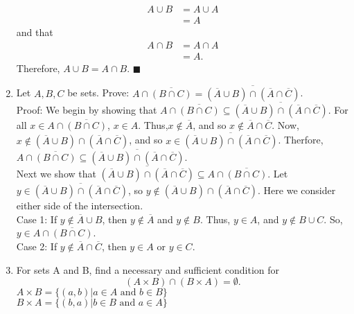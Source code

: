 \documentclass[12pt]{article}
\newcommand{\qed}{\(\blacksquare\)}
\begin{document}
\begin{enumerate}
\begin{equation*}
\begin{split}
                A \cup B &= A\cup A\\
                &=A
            \end{split}
        \end{equation*}
        and that 
        \begin{equation*}
            \begin{split}
                A \cap B &= A \cap A\\
                &=A.
            \end{split}
        \end{equation*}
        Therefore, \(A\cup B= A \cap B\). \qed
        \item Let \(A, B, C\) be sets. Prove: \(A\cap\overline{(B\cap C)} = \overline{(\overline{A}\cup B)\cap(\overline{A}\cap\overline{C})}\).\\Proof: We begin by showing that \(A\cap\overline{(B\cap C)}\subseteq \overline{(\overline{A}\cup B)\cap(\overline{A}\cap\overline{C})}\). For all \(x\in A\cap\overline{(B\cap C)}\), \(x\in A\). Thus,\(x\not\in\overline{A}\), and so \(x\not\in \overline{A}\cap\overline{C}\). Now, \(x\not\in(\overline{A}\cup B)\cap(\overline{A}\cap\overline{C}) \), and so \(x\in\overline{(\overline{A}\cup B)\cap(\overline{A}\cap\overline{C})}\). Therfore, \(A\cap\overline{(B\cap C)}\subseteq \overline{(\overline{A}\cup B)\cap(\overline{A}\cap\overline{C})}\). \\ Next we show that \(\overline{(\overline{A}\cup B)\cap(\overline{A}\cap\overline{C})} \subseteq A\cap\overline{(B\cap C)}\). Let \(y\in\overline{(\overline{A}\cup B)\cap(\overline{A}\cap\overline{C})}\), so \(y\not\in(\overline{A}\cup B)\cap(\overline{A}\cap\overline{C})\). Here we consider either side of the intersection.\\ 
        Case 1: If \(y\not\in \overline{A}\cup B\), then \(y\not\in \overline{A}\) and \(y\not\in B\). Thus, \(y\in A\), and \(y\not\in B\cup C\). So, \(y\in A\cap\overline{(B\cap C)}\).\\
        Case 2: If \(y\not\in \overline{A}\cap \overline{C}\), then \(y\in A\) or \(y\in C\).
        \item For sets A and B, find a necessary and sufficient condition for
        \begin{equation*}
            (A\times B)\cap(B\times A) = \emptyset.
        \end{equation*}
        \(A\times B =\{(a,b)|a\in A\text{ and }b\in B\}\)\\
        \(B\times A =\{(b,a)|b\in B\text{ and }a\in A\}\)\\

\end{enumerate}
\end{document}
